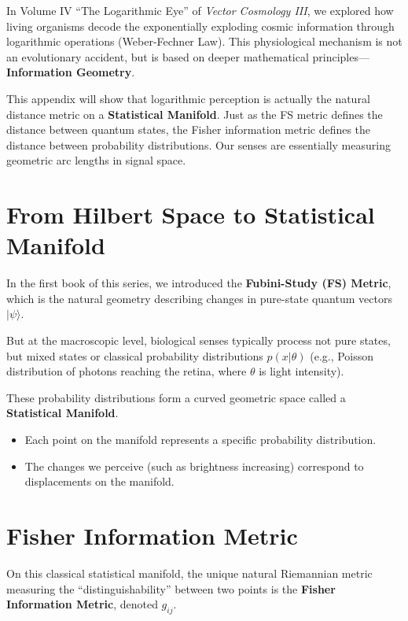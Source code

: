 \documentclass[11pt,a4paper,twoside]{book}
\begin{document}
In Volume IV ``The Logarithmic Eye'' of \textit{Vector Cosmology III}, we explored how living organisms decode the exponentially exploding cosmic information through logarithmic operations (Weber-Fechner Law). This physiological mechanism is not an evolutionary accident, but is based on deeper mathematical principles---\textbf{Information Geometry}.

This appendix will show that logarithmic perception is actually the natural distance metric on a \textbf{Statistical Manifold}. Just as the FS metric defines the distance between quantum states, the Fisher information metric defines the distance between probability distributions. Our senses are essentially measuring geometric arc lengths in signal space.

\section{From Hilbert Space to Statistical Manifold}

In the first book of this series, we introduced the \textbf{Fubini-Study (FS) Metric}, which is the natural geometry describing changes in pure-state quantum vectors $|\psi\rangle$.

But at the macroscopic level, biological senses typically process not pure states, but mixed states or classical probability distributions $p(x|\theta)$ (e.g., Poisson distribution of photons reaching the retina, where $\theta$ is light intensity).

These probability distributions form a curved geometric space called a \textbf{Statistical Manifold}.

\begin{itemize}
\item Each point on the manifold represents a specific probability distribution.

\item The changes we perceive (such as brightness increasing) correspond to displacements on the manifold.
\end{itemize}

\section{Fisher Information Metric}

On this classical statistical manifold, the unique natural Riemannian metric measuring the ``distinguishability'' between two points is the \textbf{Fisher Information Metric}, denoted $g_{ij}$.
\end{document}
